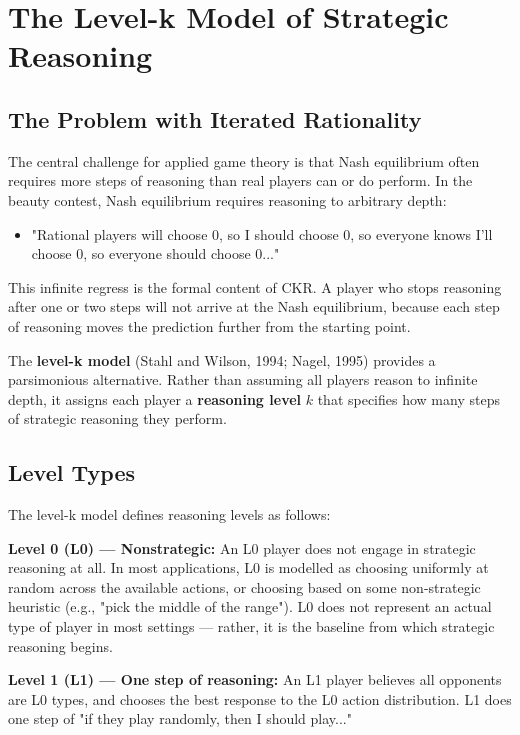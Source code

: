 \documentclass[12pt, letterpaper]{article}
\begin{document}
\medskip


\section{The Level-k Model of Strategic Reasoning}



\subsection{The Problem with Iterated Rationality}


The central challenge for applied game theory is that Nash equilibrium often requires more steps of reasoning than real players can or do perform. In the beauty contest, Nash equilibrium requires reasoning to arbitrary depth:
\begin{itemize}
\item "Rational players will choose 0, so I should choose 0, so everyone knows I'll choose 0, so everyone should choose 0..."
\end{itemize}

This infinite regress is the formal content of CKR. A player who stops reasoning after one or two steps will not arrive at the Nash equilibrium, because each step of reasoning moves the prediction further from the starting point.

The \textbf{level-k model} (Stahl and Wilson, 1994; Nagel, 1995) provides a parsimonious alternative. Rather than assuming all players reason to infinite depth, it assigns each player a \textbf{reasoning level} $k$ that specifies how many steps of strategic reasoning they perform.


\subsection{Level Types}


The level-k model defines reasoning levels as follows:

\textbf{Level 0 (L0) --- Nonstrategic:} An L0 player does not engage in strategic reasoning at all. In most applications, L0 is modelled as choosing uniformly at random across the available actions, or choosing based on some non-strategic heuristic (e.g., "pick the middle of the range"). L0 does not represent an actual type of player in most settings --- rather, it is the baseline from which strategic reasoning begins.

\textbf{Level 1 (L1) --- One step of reasoning:} An L1 player believes all opponents are L0 types, and chooses the best response to the L0 action distribution. L1 does one step of "if they play randomly, then I should play..."
\end{document}
